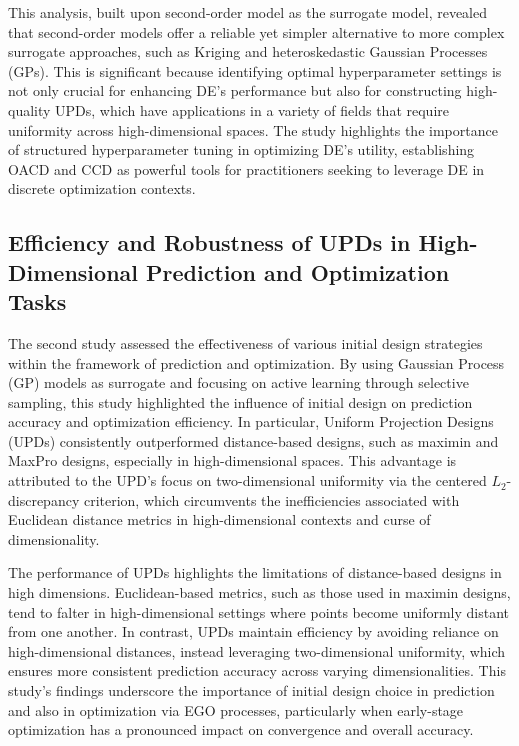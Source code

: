 This analysis, built upon second-order model as the surrogate model, revealed that second-order models offer a reliable yet simpler alternative to more complex surrogate approaches, such as Kriging and heteroskedastic Gaussian Processes (GPs). This is significant because identifying optimal hyperparameter settings is not only crucial for enhancing DE's performance but also for constructing high-quality UPDs, which have applications in a variety of fields that require uniformity across high-dimensional spaces. The study highlights the importance of structured hyperparameter tuning in optimizing DE's utility, establishing OACD and CCD as powerful tools for practitioners seeking to leverage DE in discrete optimization contexts.

\subsection{Efficiency and Robustness of UPDs in High-Dimensional Prediction and Optimization Tasks}
The second study assessed the effectiveness of various initial design strategies within the framework of prediction and optimization. By using Gaussian Process (GP) models as surrogate and focusing on active learning through selective sampling, this study highlighted the influence of initial design on prediction accuracy and optimization efficiency. In particular, Uniform Projection Designs (UPDs) consistently outperformed distance-based designs, such as maximin and MaxPro designs, especially in high-dimensional spaces. This advantage is attributed to the UPD's focus on two-dimensional uniformity via the centered \(L_2\)-discrepancy criterion, which circumvents the inefficiencies associated with Euclidean distance metrics in high-dimensional contexts and curse of dimensionality.

The performance of UPDs highlights the limitations of distance-based designs in high dimensions. Euclidean-based metrics, such as those used in maximin designs, tend to falter in high-dimensional settings where points become uniformly distant from one another. In contrast, UPDs maintain efficiency by avoiding reliance on high-dimensional distances, instead leveraging two-dimensional uniformity, which ensures more consistent prediction accuracy across varying dimensionalities. This study's findings underscore the importance of initial design choice in prediction and also in optimization via EGO processes, particularly when early-stage optimization has a pronounced impact on convergence and overall accuracy.

